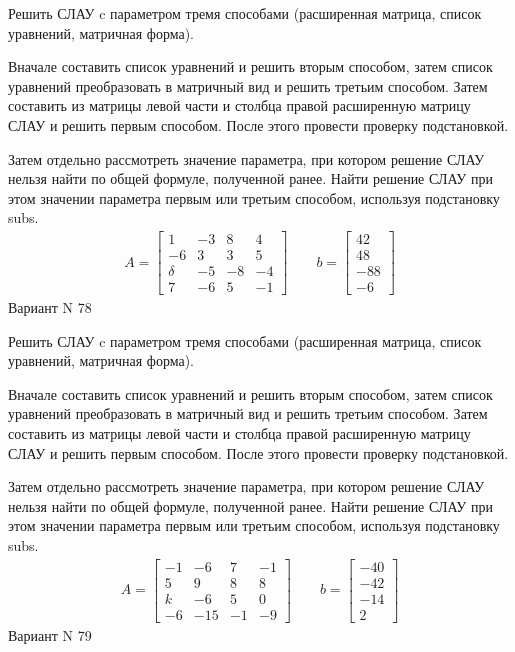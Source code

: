 \documentclass[11pt]{report}
\begin{document}
Решить СЛАУ c параметром тремя способами (расширенная матрица, список уравнений, матричная форма).

Вначале составить список уравнений и решить вторым способом,
затем список уравнений преобразовать в матричный вид и решить третьим способом.
Затем составить из матрицы левой части и столбца правой расширенную матрицу СЛАУ и решить первым способом.
После этого провести проверку подстановкой.

Затем отдельно рассмотреть значение параметра, при котором решение СЛАУ нельзя найти по общей формуле,
полученной ранее.
Найти решение СЛАУ при этом значении параметра первым или третьим способом, используя подстановку subs.
\begin{align*}
    A = \left[\begin{matrix}1 & -3 & 8 & 4\\-6 & 3 & 3 & 5\\\delta & -5 & -8 & -4\\7 & -6 & 5 & -1\end{matrix}\right]
\qquad b = \left[\begin{matrix}42\\48\\-88\\-6\end{matrix}\right]
\end{align*}
\newpage
Вариант N 78


Решить СЛАУ c параметром тремя способами (расширенная матрица, список уравнений, матричная форма).

Вначале составить список уравнений и решить вторым способом,
затем список уравнений преобразовать в матричный вид и решить третьим способом.
Затем составить из матрицы левой части и столбца правой расширенную матрицу СЛАУ и решить первым способом.
После этого провести проверку подстановкой.

Затем отдельно рассмотреть значение параметра, при котором решение СЛАУ нельзя найти по общей формуле,
полученной ранее.
Найти решение СЛАУ при этом значении параметра первым или третьим способом, используя подстановку subs.
\begin{align*}
    A = \left[\begin{matrix}-1 & -6 & 7 & -1\\5 & 9 & 8 & 8\\k & -6 & 5 & 0\\-6 & -15 & -1 & -9\end{matrix}\right]
\qquad b = \left[\begin{matrix}-40\\-42\\-14\\2\end{matrix}\right]
\end{align*}
\newpage
Вариант N 79
\end{document}
